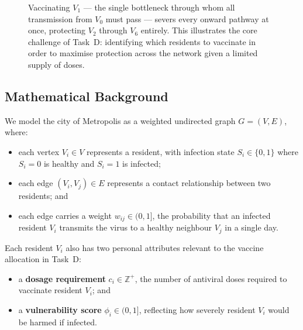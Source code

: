 \documentclass[12pt,a4paper]{article}
\begin{document}
\begin{figure}[H]
\caption{Vaccinating $V_1$ --- the single bottleneck through 
whom all transmission from $V_0$ must pass --- severs every 
onward pathway at once, protecting $V_2$ through $V_6$ entirely. 
This illustrates the core challenge of Task~D: identifying which 
residents to vaccinate in order to maximise protection across 
the network given a limited supply of doses.}
\label{fig:vaccination}
\end{figure}

\subsection{Mathematical Background}

We model the city of Metropolis as a weighted undirected graph 
$G = (V, E)$, where:
\begin{itemize}
    \item each vertex $V_i \in V$ represents a resident, with 
          infection state $S_i \in \{0, 1\}$ where $S_i = 0$ 
          is healthy and $S_i = 1$ is infected;
    \item each edge $(V_i, V_j) \in E$ represents a contact 
          relationship between two residents; and
    \item each edge carries a weight $w_{ij} \in (0, 1]$, 
          the probability that an infected resident $V_i$ 
          transmits the virus to a healthy neighbour $V_j$ 
          in a single day.
\end{itemize}

Each resident $V_i$ also has two personal attributes relevant 
to the vaccine allocation in Task~D:
\begin{itemize}
    \item a \textbf{dosage requirement} $c_i \in \mathbb{Z}^+$, 
          the number of antiviral doses required to vaccinate 
          resident $V_i$; and
    \item a \textbf{vulnerability score} $\phi_i \in (0, 1]$, 
          reflecting how severely resident $V_i$ would be 
          harmed if infected.
\end{itemize}
\end{document}
